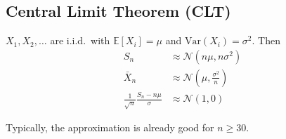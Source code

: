 \subsection{Central Limit Theorem (CLT)}
$X_1, X_2, \ldots$ are i.i.d.\ with $\mathbb{E}[X_i]=\mu$ and $\mathrm{Var}(X_i)=\sigma^2$. Then
\begin{align*}
    S_n                                       & \approx \mathcal{N}(n\mu, n\sigma^2)         \\
    \bar{X}_n                                 & \approx \mathcal{N}(\mu, \frac{\sigma^2}{n}) \\
    \frac{1}{\sqrt{n}}\frac{S_n-n\mu}{\sigma} & \approx\mathcal{N}(1,0)
\end{align*}

Typically, the approximation is already good for $n \geq 30$.
